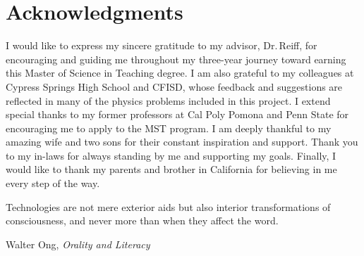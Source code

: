 \documentclass[12pt]{article}
\begin{document}
\section*{Acknowledgments}
I would like to express my sincere gratitude to my advisor, Dr.\,Reiff, for encouraging and guiding me throughout my three-year journey toward earning this Master of Science in Teaching degree. I am also grateful to my colleagues at Cypress Springs High School and CFISD, whose feedback and suggestions are reflected in many of the physics problems included in this project. I extend special thanks to my former professors at Cal Poly Pomona and Penn State for encouraging me to apply to the MST program. I am deeply thankful to my amazing wife and two sons for their constant inspiration and support. Thank you to my in-laws for always standing by me and supporting my goals. Finally, I would like to thank my parents and brother in California for believing in me every step of the way.

\tableofcontents
\clearpage



\epigraph{Technologies are not mere exterior aids but also interior transformations of consciousness, and never more than when they affect the word.}{Walter Ong, \emph{Orality and Literacy}}
\end{document}
